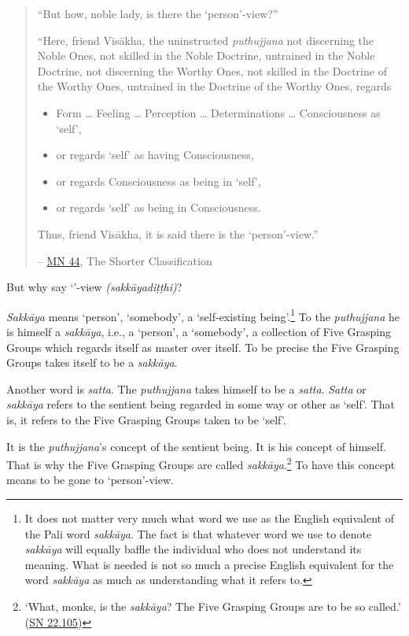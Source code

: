 \begin{quote}
``But how, noble lady, is there the `person'-view?''

``Here, friend Visākha, the uninstructed \emph{puthujjana} not discerning the Noble Ones, not skilled in the Noble Doctrine, untrained in the Noble Doctrine, not discerning the Worthy Ones, not skilled in the Doctrine of the Worthy Ones, untrained in the Doctrine of the Worthy Ones, regards

\begin{itemize}
\item
  Form \ldots{} Feeling \ldots{} Perception \ldots{} Determinations \ldots{} Consciousness as `self',
\item
  or regards `self' as having Consciousness,
\item
  or regards Consciousness as being in `self',
\item
  or regards `self' as being in Consciousness.
\end{itemize}

Thus, friend Visākha, it is said there is the `person'-view.''

 -- \href{https://suttacentral.net/mn44/en/sujato}{MN 44}, The Shorter Classification
\end{quote}

\clearpage

But why say `'-view \emph{(sakkāyadiṭṭhi)}?

\emph{Sakkāya} means `person', `somebody', a `self-existing being'.\footnote{It does not matter very much what word we use as the English equivalent of the Pali word \emph{sakkāya}. The fact is that whatever word we use to denote \emph{sakkāya} will equally baffle the individual who does not understand its meaning. What is needed is not so much a precise English equivalent for the word \emph{sakkāya} as much as understanding what it refers to.} To the \emph{puthujjana} he is himself a \emph{sakkāya}, i.e., a `person', a `somebody', a collection of Five Grasping Groups which regards itself as master over itself. To be precise the Five Grasping Groups takes itself to be a \emph{sakkāya}.

Another word is \emph{satta}. The \emph{puthujjana} takes himself to be a \emph{satta}. \emph{Satta} or \emph{sakkāya} refers to the sentient being regarded in some way or other as `self'. That is, it refers to the Five Grasping Groups taken to be `self'.

It is the \emph{puthujjana}'s concept of the sentient being. It is his concept of himself. That is why the Five Grasping Groups are called \emph{sakkāya}.\footnote{`What, monks, is the \emph{sakkāya}? The Five Grasping Groups are to be so called.' (\href{https://suttacentral.net/sn22.105/en/sujato}{SN 22.105})} To have this concept means to be gone to `person'-view.

